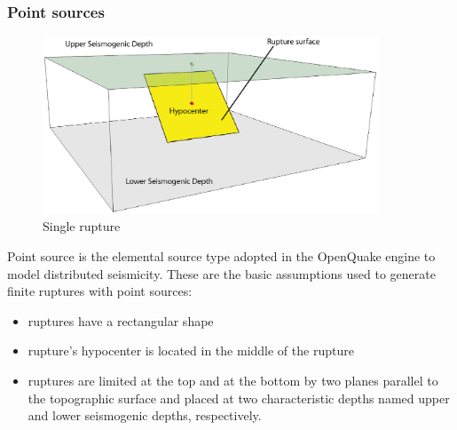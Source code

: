 \subsubsection{Point sources}
\label{hazard:seismic_source_types:pointSources}
\begin{figure}[!ht]
\centering
\includegraphics[width=10cm]{./figures/hazard/single_rupture.eps}
\caption{Single rupture}
\label{fig:single_rupture}
\end{figure}
Point source is the elemental source type adopted in the OpenQuake engine 
to model distributed seismicity. These are the basic assumptions used to 
generate finite ruptures with point sources:
\begin{itemize}
	\item ruptures have a rectangular shape
	\item rupture's hypocenter is located in the middle of the rupture
	\item ruptures are limited at the top and at the bottom by two planes 
	parallel to the topographic surface and placed at two characteristic 
	depths named upper and lower seismogenic depths, respectively.
\end{itemize} 
%
